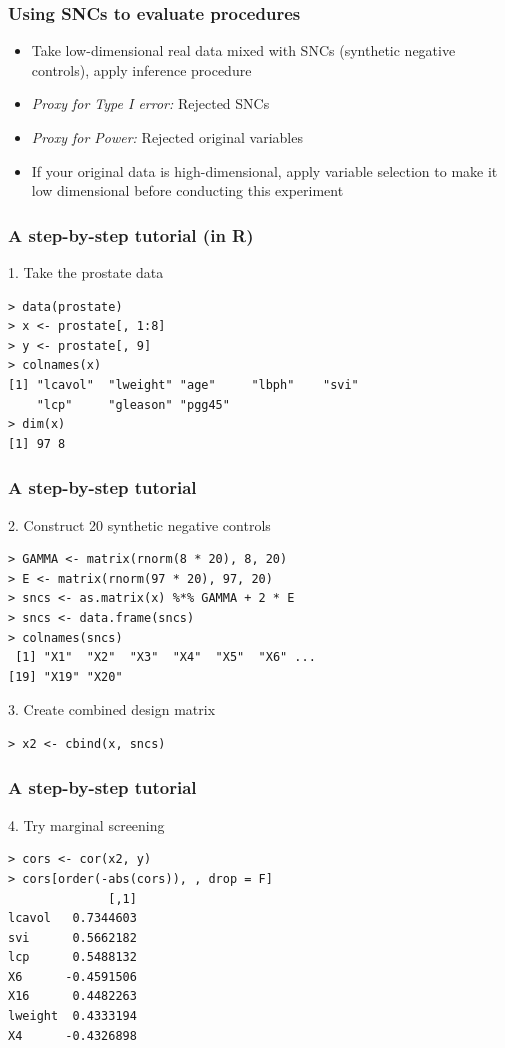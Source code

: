 \documentclass{beamer}
\begin{document}
\begin{frame}
\frametitle{Using SNCs to evaluate procedures}
\begin{itemize}
\item Take low-dimensional real data mixed with SNCs (synthetic negative controls), apply inference procedure
\item \emph{Proxy for Type I error:} Rejected SNCs
\item \emph{Proxy for Power:} Rejected original variables
\item If your original data is high-dimensional, apply variable selection to make it low dimensional before conducting this experiment
\end{itemize}
\end{frame}

\begin{frame}[fragile]
\frametitle{A step-by-step tutorial (in R)}
1. Take the prostate data
\begin{verbatim}
> data(prostate)
> x <- prostate[, 1:8]
> y <- prostate[, 9]
> colnames(x)
[1] "lcavol"  "lweight" "age"     "lbph"    "svi"
    "lcp"     "gleason" "pgg45"  
> dim(x)
[1] 97 8
\end{verbatim}
\end{frame}

\begin{frame}[fragile]
\frametitle{A step-by-step tutorial}
2. Construct 20 synthetic negative controls
\begin{verbatim}
> GAMMA <- matrix(rnorm(8 * 20), 8, 20)
> E <- matrix(rnorm(97 * 20), 97, 20)
> sncs <- as.matrix(x) %*% GAMMA + 2 * E
> sncs <- data.frame(sncs)
> colnames(sncs)
 [1] "X1"  "X2"  "X3"  "X4"  "X5"  "X6" ...
[19] "X19" "X20"
\end{verbatim}
3. Create combined design matrix
\begin{verbatim}
> x2 <- cbind(x, sncs)
\end{verbatim}
\end{frame}

\begin{frame}[fragile]
\frametitle{A step-by-step tutorial}
4. Try marginal screening
\begin{verbatim}
> cors <- cor(x2, y)
> cors[order(-abs(cors)), , drop = F]
              [,1]
lcavol   0.7344603
svi      0.5662182
lcp      0.5488132
X6      -0.4591506
X16      0.4482263
lweight  0.4333194
X4      -0.4326898
\end{verbatim}
\end{frame}
\end{document}
